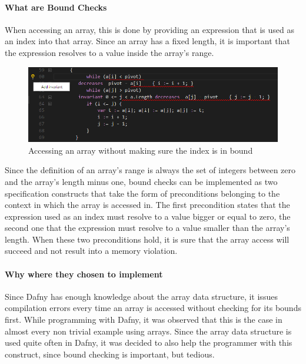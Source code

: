 \paragraph{What are Bound Checks}
When accessing an array, this is done by providing an expression that is used as an index into that array. Since an array has a fixed length, it is important that the expression resolves to a value inside the array's range. \newline
\begin{figure}[H]
	\centering
	\includegraphics[width=1\textwidth]{img/indexOutRangeDiag}
	\caption{Accessing an array without making sure the index is in bound}
	\label{fig:dfindexOutOfRange}
\end{figure}
Since the definition of an array's range is always the set of integers between zero and the array's length minus one, bound checks can be implemented as two specification constructs that take the form of preconditions belonging to the context in which the array is accessed in. \newline
The first precondition states that the expression used as an index must resolve to a value bigger or equal to zero, the second one that the expression must resolve to a value smaller than the array's length. When these two preconditions hold, it is sure that the array access will succeed and not result into a memory violation. 
\paragraph{Why where they chosen to implement}
Since Dafny has enough knowledge about the array data structure, it issues compilation errors every time an array is accessed without checking for its bounds first. While programming with Dafny, it was observed that this is the case in almost every non trivial example using arrays. Since the array data structure is used quite often in Dafny, it was decided to also help the programmer with this construct, since bound checking is important, but tedious.
